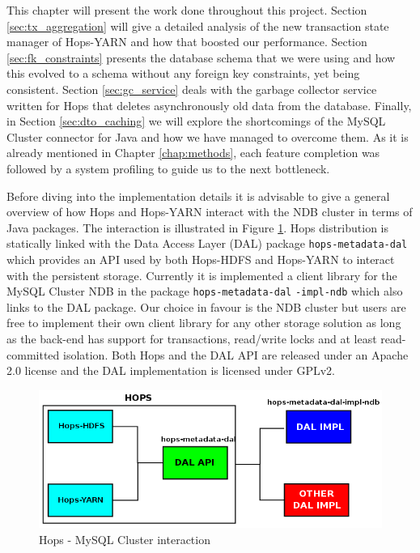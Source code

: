 This chapter will present the work done throughout this
project. Section \ref{sec:tx_aggregation} will give a detailed
analysis of the new transaction state manager of Hops-YARN and how
that boosted our performance. Section \ref{sec:fk_constraints}
presents the database schema that we were using and how this evolved
to a schema without any foreign key constraints, yet being
consistent. Section \ref{sec:gc_service} deals with the garbage
collector service written for Hops that deletes asynchronously old
data from the database. Finally, in Section \ref{sec:dto_caching} we
will explore the shortcomings of the MySQL Cluster connector for Java and
how we have managed to overcome them. As it is already mentioned in Chapter
\ref{chap:methods}, each feature completion was followed by a system
profiling to guide us to the next bottleneck.

Before diving into the implementation details it is advisable to give a
general overview of how Hops and Hops-YARN interact with the NDB
cluster in terms of Java packages. The interaction is illustrated in
Figure \ref{fig:impl_hops_ndb}. Hops distribution is statically linked
with the Data Access Layer (DAL) package \texttt{hops-metadata-dal}
which provides an API used by both Hops-HDFS and Hops-YARN to interact
with the persistent storage. Currently it is implemented a client
library for the MySQL Cluster NDB in the package
\texttt{hops-metadata-dal} \texttt{-impl-ndb} which also links to the DAL
package. Our choice in favour is the NDB cluster but users are free to
implement their own client library for any other storage solution as
long as the back-end has support for transactions, read/write locks and
at least read-committed isolation. Both Hops and the DAL API are
released under an Apache 2.0 license and the DAL implementation is
licensed under GPLv2.

\begin{figure}
\centering
\includegraphics[scale=0.5]{resources/images/Implementation/hops_ndb_interaction.png}
\caption{Hops - MySQL Cluster interaction}
\label{fig:impl_hops_ndb}
\end{figure}
